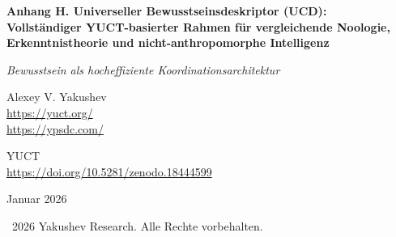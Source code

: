 \documentclass[12pt,a4paper]{article}
\DeclareRobustCommand{\alD}{\texorpdfstring{\ensuremath{\alpha_{\mathrm{D}}}}{alpha_D}}
\DeclareRobustCommand{\beI}{\texorpdfstring{\ensuremath{\beta_{\mathrm{I}}}}{beta_I}}
\DeclareRobustCommand{\gaR}{\texorpdfstring{\ensuremath{\gamma_{\mathrm{R}}}}{gamma_R}}
\newcommand{\eff}{\mathrm{eff}}
\newcommand{\Ke}{K_{\eff}}
\begin{document}
	
	\begin{titlepage}
		\begin{center}
			\vspace*{0cm}
			
			\Huge\textbf{Anhang H. Universeller Bewusstseinsdeskriptor (UCD):\\ Vollständiger YUCT-basierter Rahmen für vergleichende Noologie,\\ Erkenntnistheorie und nicht-anthropomorphe Intelligenz}
			
			\vspace{1cm}
			
			\small\textit{Bewusstsein als hocheffiziente Koordinationsarchitektur}
			
			\vspace{1cm}
			\Large
			Alexey V. Yakushev\\
			
			\url{https://yuct.org/}\\
			\url{https://ypsdc.com/}
			
			\vspace{2cm}
			\large YUCT \\ 
			\url{https://doi.org/10.5281/zenodo.18444599}\\
			\vspace{1cm}
			
			\vspace{0cm}
			\large
			Januar 2026
			
			\vspace{6cm}
			\textcopyright~2026 Yakushev Research. Alle Rechte vorbehalten.
			
			\newpage
			
			\begin{abstract}
				\noindent
				Dieses Papier präsentiert das vollständige vereinheitlichte Bewusstseins-Wissens-Rahmenwerk, das den Universellen Bewusstseinsdeskriptor (UCD) mit der Yakushev Unified Coordination Theory (YUCT) integriert. Aufbauend auf der fundamentalen Einsicht, dass Bewusstsein/Intelligenz/Geist eine hocheffiziente (\(\Ke \gg 1\)) Koordinationsarchitektur ist, entwickeln wir: (1) Eine vollständige mathematische Formulierung der D+I\(\cdot\)R-Triade als fundamentale Zerlegung jedes kognitiven Agenten; (2) Drei Spektralparameter (\alD, \beI, \gaR) zum quantitativen Vergleich über Spezies und Substrate hinweg; (3) Eine Erkenntnistheorie als koordinierte Informationsverarbeitung; (4) Detaillierte experimentelle Protokolle zur Messung von Bewusstsein in biologischen, künstlichen und extraterrestrischen Systemen; (5) Spezifische Vorhersagen für astrophysikalische SETI 2.0-Suchen; (6) Vergleich mit existierenden Bewusstseinstheorien (IIT, Global Workspace, Predictive Processing); (7) Ethische Implikationen und praktische Anwendungen in Medizin, KI-Sicherheit und Cybersicherheit; (8) Vollständige mathematische Beweise einschließlich Theoreme zur kognitiven Hierarchie, oberen Grenzen der Koordinationseffizienz und Schranken der Berechnungskomplexität. Das Rahmenwerk löst lange bestehende philosophische Probleme und liefert gleichzeitig überprüfbare Vorhersagen in mehr als 15 experimentellen Bereichen.
			\end{abstract}
			

\end{center}
\end{titlepage}
\end{document}
